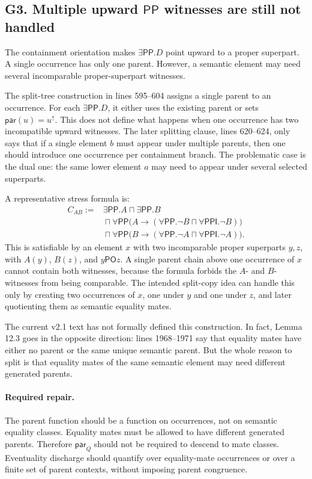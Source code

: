 \documentclass[11pt]{article}
\newcommand{\PO}{\mathsf{PO}}
\newcommand{\PP}{\mathsf{PP}}
\newcommand{\PPI}{\mathsf{PPI}}
\newcommand{\parQ}{\mathsf{par}_Q}
\begin{document}
\subsection{G3. Multiple upward $\PP$ witnesses are still not handled}

The containment orientation makes \(\exists\PP.D\) point upward to a proper
superpart.  A single occurrence has only one parent.  However, a semantic element
may need several incomparable proper-superpart witnesses.

The split-tree construction in lines 595--604 assigns a single parent to an
occurrence.  For each \(\exists\PP.D\), it either uses the existing parent or
sets \(\mathsf{par}(u)=u^\uparrow\).  This does not define what happens when
one occurrence has two incompatible upward witnesses.  The later splitting
clause, lines 620--624, only says that if a single element \(b\) must appear
under multiple parents, then one should introduce one occurrence per containment
branch.  The problematic case is the dual one: the same lower element \(a\)
may need to appear under several selected superparts.

A representative stress formula is:
\[
\begin{aligned}
C_{AB}:={}&\exists\PP.A \sqcap \exists\PP.B \\
&{}\sqcap \forall\PP\bigl(A\rightarrow(\forall\PP.\neg B\sqcap\forall\PPI.\neg B)\bigr) \\
&{}\sqcap \forall\PP\bigl(B\rightarrow(\forall\PP.\neg A\sqcap\forall\PPI.\neg A)\bigr).
\end{aligned}
\]
This is satisfiable by an element \(x\) with two incomparable proper superparts
\(y,z\), with \(A(y)\), \(B(z)\), and \(y\PO z\).  A single parent chain above
one occurrence of \(x\) cannot contain both witnesses, because the formula
forbids the \(A\)- and \(B\)-witnesses from being comparable.  The intended
split-copy idea can handle this only by creating two occurrences of \(x\), one
under \(y\) and one under \(z\), and later quotienting them as semantic equality
mates.

The current v2.1 text has not formally defined this construction.  In fact,
Lemma 12.3 goes in the opposite direction: lines 1968--1971 say that equality
mates have either no parent or the same unique semantic parent.  But the whole
reason to split is that equality mates of the same semantic element may need
different generated parents.

\paragraph{Required repair.}
The parent function should be a function on occurrences, not on semantic
equality classes.  Equality mates must be allowed to have different generated
parents.  Therefore \(\parQ\) should not be required to descend to mate classes.
Eventuality discharge should quantify over equality-mate occurrences or over a
finite set of parent contexts, without imposing parent congruence.
\end{document}
